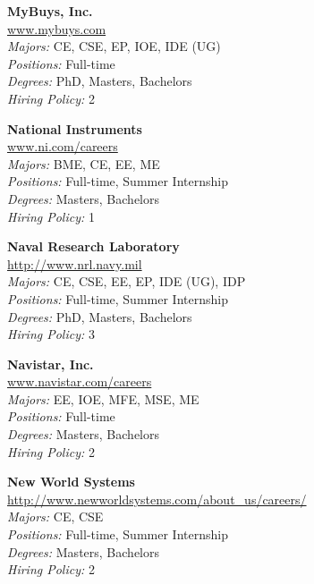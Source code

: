 \documentclass[twoside]{article}
\begin{document}
\begin{center}
\begin{multicols}{3}
\begin{minipage}{.9\columnwidth}{\Large\bf MyBuys, Inc. }\\
	\url{www.mybuys.com}\\
	\emph{Majors:} CE, CSE, EP, IOE, IDE (UG)\\
	\emph{Positions:} Full-time\\
	\emph{Degrees:} PhD, Masters, Bachelors\\
	\emph{Hiring Policy:} 2\\
\end{minipage}
 
\begin{minipage}{.9\columnwidth}{\Large\bf National Instruments }\\
	\url{www.ni.com/careers}\\
	\emph{Majors:} BME, CE, EE, ME\\
	\emph{Positions:} Full-time, Summer Internship\\
	\emph{Degrees:} Masters, Bachelors\\
	\emph{Hiring Policy:} 1\\
\end{minipage}
 
\begin{minipage}{.9\columnwidth}{\Large\bf Naval Research Laboratory }\\
	\url{http://www.nrl.navy.mil}\\
	\emph{Majors:} CE, CSE, EE, EP, IDE (UG), IDP\\
	\emph{Positions:} Full-time, Summer Internship\\
	\emph{Degrees:} PhD, Masters, Bachelors\\
	\emph{Hiring Policy:} 3\\
\end{minipage}
 
\begin{minipage}{.9\columnwidth}{\Large\bf Navistar, Inc. }\\
	\url{www.navistar.com/careers}\\
	\emph{Majors:} EE, IOE, MFE, MSE, ME\\
	\emph{Positions:} Full-time\\
	\emph{Degrees:} Masters, Bachelors\\
	\emph{Hiring Policy:} 2\\
\end{minipage}
 
\begin{minipage}{.9\columnwidth}{\Large\bf New World Systems }\\
	\url{http://www.newworldsystems.com/about_us/careers/}\\
	\emph{Majors:} CE, CSE\\
	\emph{Positions:} Full-time, Summer Internship\\
	\emph{Degrees:} Masters, Bachelors\\
	\emph{Hiring Policy:} 2\\
\end{minipage}
 

\end{multicols}
\end{center}
\end{document}
